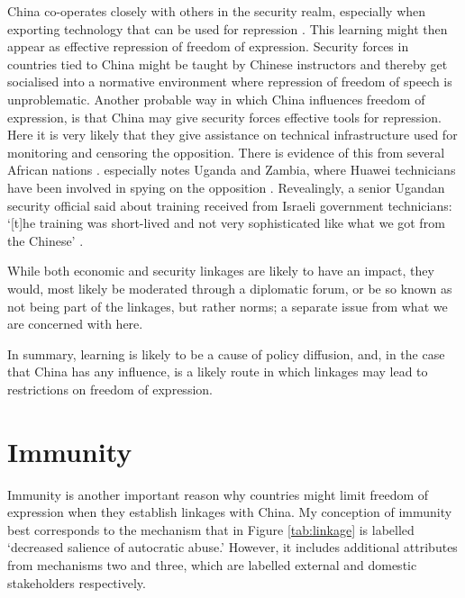  China co-operates closely with others in the security realm, especially when exporting technology that can be used for repression \citep{hoffman_chinas_2022}. This learning might then appear as effective repression of freedom of expression. Security forces in countries tied to China might be taught by Chinese instructors and thereby get socialised into a normative environment where repression of freedom of speech is unproblematic. Another probable way in which China influences freedom of expression, is that China may give security forces effective tools for repression. Here it is very likely that they give assistance on technical infrastructure used for monitoring and censoring the opposition. There is evidence of this from several African nations \citep{hoffman_chinas_2022, parkinson_huawei_2019}.  \citet{parkinson_huawei_2019} especially notes Uganda and Zambia, where Huawei technicians have been involved in spying on the opposition \citep{parkinson_huawei_2019}. Revealingly, a senior Ugandan security official said about training received from Israeli government technicians: `[t]he training was short-lived and not very sophisticated like what we got from the Chinese' \citep{parkinson_huawei_2019}. 

While both economic and security linkages are likely to have an impact, they would, most likely be moderated through a diplomatic forum, or be so known as not being part of the linkages, but rather norms; a separate issue from what we are concerned with here.

In summary, learning is likely to be a cause of policy diffusion, and, in the case that China has any influence, is a likely route in which linkages may lead to restrictions on freedom of expression.

\section{Immunity}
Immunity is another important reason why countries might limit freedom of expression when they establish linkages with China. My conception of immunity best corresponds to the mechanism that in Figure \ref{tab:linkage} is labelled `decreased salience of autocratic abuse.' However, it includes additional attributes from mechanisms two and three, which are labelled external and domestic stakeholders respectively. 

